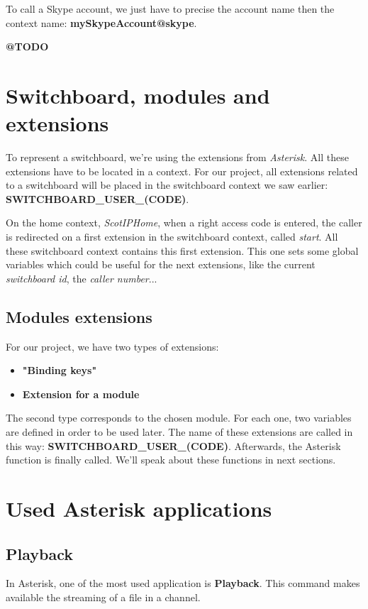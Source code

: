 To call a Skype account, we just have to precise the account name then the context name: \textbf{mySkypeAccount@skype}. 


\textbf{@TODO}

\section{Switchboard, modules and extensions}
To represent a switchboard, we're using the extensions from \textit{Asterisk}. All these extensions have to be located in a context. For our project, all extensions related to a switchboard will be placed in the switchboard context we saw earlier: \textbf{SWITCHBOARD\_USER\_(CODE)}. \newline

On the home context, \textit{ScotIPHome}, when a right access code is entered, the caller is redirected on a first extension in the switchboard context, called \textit{start}.
All these switchboard context contains this first extension. This one sets some global variables which could be useful for the next extensions, like the current \textit{switchboard id}, the \textit{caller number}... \newline

\subsection{Modules extensions}

For our project, we have two types of extensions:
\begin{itemize}
\item \textbf{"Binding keys"}
\item \textbf{Extension for a module}
\end{itemize}

The second type corresponds to the chosen module. For each one, two variables are defined in order to be used later. The name of these extensions are called in this way: \textbf{SWITCHBOARD\_USER\_(CODE)}.
Afterwards, the Asterisk function is finally called.  We'll speak about these functions in next sections.





\section{Used Asterisk applications}
\subsection{Playback}
In Asterisk, one of the most used application is \textbf{Playback}. This command makes available the streaming of a file in a channel. 


